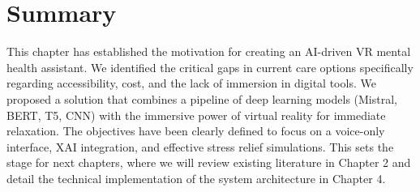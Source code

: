 \section{Summary}

This chapter has established the motivation for creating an AI-driven VR mental health assistant. We identified the critical gaps in current care options specifically regarding accessibility, cost, and the lack of immersion in digital tools. We proposed a solution that combines a pipeline of deep learning models (Mistral, BERT, T5, CNN) with the immersive power of virtual reality for immediate relaxation. The objectives have been clearly defined to focus on a voice-only interface, XAI integration, and effective stress relief simulations. This sets the stage for next chapters, where we will review existing literature in Chapter 2 and detail the technical implementation of the system architecture in Chapter 4.
